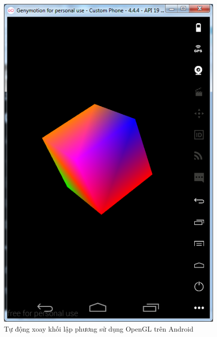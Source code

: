 \documentclass[13pt,a4paper]{extreport}
\begin{document}
\begin{enumerate}[{\it a.}]
\begin{itemize}
\begin{figure}[!h]
\begin{center}
						\hspace{.5cm}
						\includegraphics[scale=.6]{opengles-cube-4.png}
					\end{center}
					\caption{Tự động xoay khối lập phương sử dụng OpenGL trên Android}
					\label{Fig:opengles-cube-rotate}
				\end{figure}							 
			\end{itemize}
	\end{enumerate}
	
\end{document}
